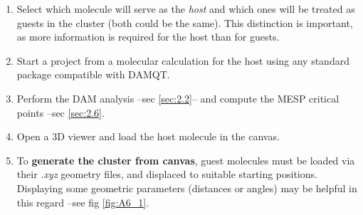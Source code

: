 \documentclass[10pt]{article}
\begin{document}
\begin{enumerate}
\item Select which molecule will serve as the {\it host} and which ones 
will be treated as guests in the cluster (both could be the same).
This distinction is important, as more information is required for the host than for 
guests.

\item Start a project from a molecular calculation for the host using any 
standard package compatible with DAMQT.

\item Perform the DAM analysis --sec \ref{sec:2.2}-- and compute the 
MESP critical points --sec \ref{sec:2.6}.

\item Open a 3D viewer and load the host molecule in the canvas.

\item To {\bf generate the cluster from canvas}, guest molecules must be loaded
via their {\it .xyz} geometry files,
and displaced to suitable starting positions. Displaying some geometric parameters
(distances or angles) may be helpful in this regard --see fig \ref{fig:A6_1}.


\end{enumerate}
\end{document}
